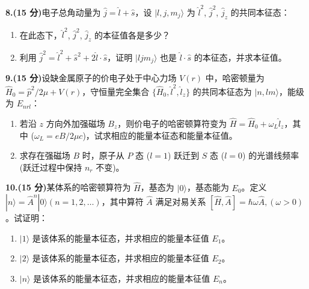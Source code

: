 \textbf{8.(15 分)}电子总角动量为 $\hat{j} = \hat{l} + \hat{s}$，设 $|l, j, m_j \rangle$ 为 $\hat{l}^2$, $\hat{j}^2$, $\hat{j}_z$ 的共同本征态：

\begin{enumerate}
    \item 在此态下，$\hat{l}^2$, $\hat{j}^2$, $\hat{j}_z$ 的本征值各是多少？
    \item 利用 $\hat{j}^2 = \hat{l}^2 + \hat{s}^2 + 2\hat{l} \cdot \hat{s}$，证明 $|l j m_j\rangle$ 也是 $\hat{l} \cdot \hat{s}$ 的本征态，并求本征值。
\end{enumerate}

\textbf{9.(15 分)}设缺金属原子的价电子处于中心力场 $V(r)$ 中，哈密顿量为 $\hat{H}_0 = \hat{p}^2/2\mu + V(r)$，守恒量完全集合 $\{\hat{H}_0, \hat{l}^2, \hat{l}_z \}$ 的共同本征态为 $|n,l m\rangle$，能级为 $E_{nrl}$：

\begin{enumerate}
    \item  若沿 $z$ 方向外加强磁场 $B_z$，则价电子的哈密顿算符变为 $\hat{H} = \hat{H}_0 + \omega_L \hat{l}_z$，其中 ($\omega_L = eB/2\mu c$)，试求相应的能量本征态和能量本征值。
    \item  求存在强磁场 $B$ 时，原子从 $P$ 态 ($l = 1$) 跃迁到 $S$ 态 ($l = 0$) 的光谱线频率 (跃迁过程中保持 $n_r$ 不变)。
\end{enumerate}

\textbf{10.(15 分)}某体系的哈密顿算符为 $\hat{H}$，基态为 $|0\rangle$，基态能为 $E_0$。定义 $|n\rangle = \hat{A}^n |0\rangle (n = 1, 2, \dots)$，其中算符 $\hat{A}$ 满足对易关系 $[\hat{H}, \hat{A}] = \hbar \omega \hat{A}, (\omega > 0)$。试证明：

\begin{enumerate}
    \item  $|1\rangle$ 是该体系的能量本征态，并求相应的能量本征值 $E_1$。
    \item  $|2\rangle$ 是该体系的能量本征态，并求相应的能量本征值 $E_2$。
    \item  $|n\rangle$ 是该体系的能量本征态，并求相应的能量本征值 $E_n$。
\end{enumerate}